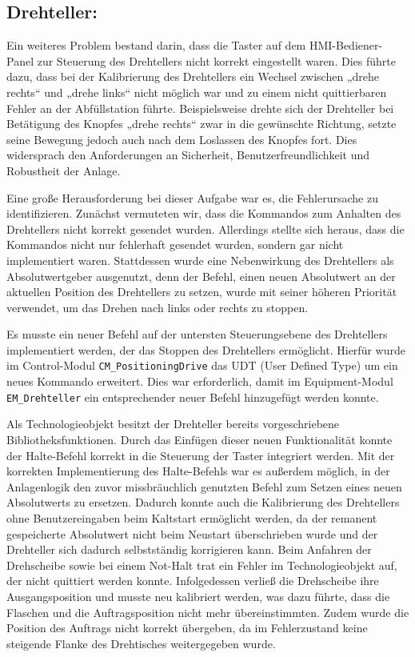 \subsection{Drehteller:} 
Ein weiteres Problem bestand darin, dass die Taster auf dem HMI-Bediener-Panel zur Steuerung des Drehtellers nicht korrekt eingestellt waren. Dies führte dazu, dass bei der Kalibrierung des Drehtellers ein Wechsel zwischen „drehe rechts“ und „drehe links“ nicht möglich war und zu einem nicht quittierbaren Fehler an der Abfüllstation führte. Beispielsweise drehte sich der Drehteller bei Betätigung des Knopfes „drehe rechts“ zwar in die gewünschte Richtung, setzte seine Bewegung jedoch auch nach dem Loslassen des Knopfes fort. Dies widersprach den Anforderungen an Sicherheit, Benutzerfreundlichkeit und Robustheit der Anlage.

Eine große Herausforderung bei dieser Aufgabe war es, die Fehlerursache zu identifizieren. Zunächst vermuteten wir, dass die Kommandos zum Anhalten des Drehtellers nicht korrekt gesendet wurden. Allerdings stellte sich heraus, dass die Kommandos nicht nur fehlerhaft gesendet wurden, sondern gar nicht implementiert waren. Stattdessen wurde eine Nebenwirkung des Drehtellers als Absolutwertgeber ausgenutzt, denn der Befehl, einen neuen Absolutwert an der aktuellen Position des Drehtellers zu setzen, wurde mit seiner höheren Priorität verwendet, um das Drehen nach links oder rechts zu stoppen.

Es musste ein neuer Befehl auf der untersten Steuerungsebene des Drehtellers implementiert werden, der das Stoppen des Drehtellers ermöglicht. Hierfür wurde im Control-Modul \texttt{CM\_PositioningDrive} das UDT (User Defined Type) um ein neues Kommando erweitert. Dies war erforderlich, damit im Equipment-Modul \texttt{EM\_Drehteller} ein entsprechender neuer Befehl hinzugefügt werden konnte.

Als Technologieobjekt besitzt der Drehteller bereits vorgeschriebene Bibliotheksfunktionen. Durch das Einfügen dieser neuen Funktionalität konnte der Halte-Befehl korrekt in die Steuerung der Taster integriert werden. Mit der korrekten Implementierung des Halte-Befehls war es außerdem möglich, in der Anlagenlogik den zuvor missbräuchlich genutzten Befehl zum Setzen eines neuen Absolutwerts zu ersetzen. Dadurch konnte auch die Kalibrierung des Drehtellers ohne Benutzereingaben beim Kaltstart ermöglicht werden, da der remanent gespeicherte Absolutwert nicht beim Neustart überschrieben wurde und der Drehteller sich dadurch selbstständig korrigieren kann.
Beim Anfahren der Drehscheibe sowie bei einem Not-Halt trat ein Fehler im Technologieobjekt auf, der nicht quittiert werden konnte. Infolgedessen verließ die Drehscheibe ihre Ausgangsposition und musste neu kalibriert werden, was dazu führte, dass die Flaschen und die Auftragsposition nicht mehr übereinstimmten. Zudem wurde die Position des Auftrags nicht korrekt übergeben, da im Fehlerzustand keine steigende Flanke des Drehtisches weitergegeben wurde.

